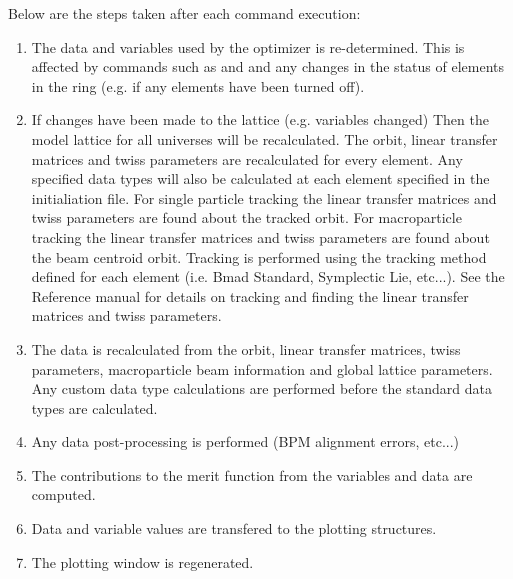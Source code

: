 Below are the steps taken after each \tao command execution:
\begin{enumerate}
  \item The data and variables used by the optimizer is re-determined. This is
affected by commands such as  and  and any changes in the
status of elements in the ring (e.g. if any elements have been turned off). 
  \item If changes have been made to the lattice (e.g. variables changed) Then
the model lattice for all universes will be recalculated. The
 orbit, linear transfer matrices and twiss parameters are recalculated
for every element. Any specified data types will also be calculated at each
element specified in the initialiation file.
For single particle tracking the linear transfer matrices and twiss parameters are 
found about the tracked
orbit. For macroparticle tracking the linear transfer matrices and twiss parameters are 
found about the beam centroid orbit. 
Tracking is performed using the tracking method defined for
each element (i.e. Bmad Standard, Symplectic Lie, etc...). See the \bmad 
Reference manual for details on tracking and finding
the linear transfer matrices and twiss parameters.
  \item The  data is recalculated from the  orbit, linear
transfer matrices, twiss parameters, macroparticle beam information and global
lattice parameters.
 Any custom  data type calculations
are performed before the standard \tao data types are calculated.
  \item Any data post-processing is performed (BPM alignment errors, etc...) 
  \item The contributions to the merit function from the variables and data are
computed.
  \item Data and variable values are transfered to the plotting structures.
  \item The plotting window is regenerated.
\end{enumerate}

